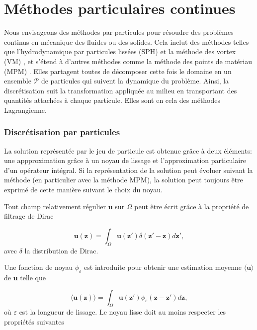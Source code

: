 \section{Méthodes particulaires continues}\label{sec:part_cont}
Nous envisageons des méthodes par particules pour résoudre des problèmes continus en mécanique des fluides ou des solides. Cela inclut des méthodes telles que l'hydrodynamique par particules lissées (SPH) \cite{lucy_1977,gingold_monaghan_sph_1977} et la méthode des vortex (VM) \cite{cottet_vortex_2000}, et s'étend à d'autres méthodes comme la méthode des points de matériau (MPM) \cite{sulsky_particle_1994}. Elles partagent toutes de décomposer cette fois le domaine en un ensemble $\mathcal{P}$ de particules qui suivent la dynamique du problème. Ainsi, la discrétisation suit la transformation appliquée au milieu en transportant des quantités attachées à chaque particule. Elles sont en cela des méthodes Lagrangienne.

\subsubsection{Discrétisation par particules}

La solution représentée par le jeu de particule est obtenue grâce à deux éléments: une appproximation grâce à un noyau de lissage et l'approximation particulaire d'un opérateur intégral. Si la représentation de la solution peut évoluer suivant la méthode (en particulier avec la méthode MPM), la solution peut toujours être exprimé de cette manière suivant le choix du noyau.

Tout champ relativement régulier $\bm{u}$ sur $\Omega$ peut être écrit grâce à la propriété de filtrage de Dirac

\begin{equation*}
    \bm{u}(\bm{z}) = \int_{\Omega} \bm{u}(\bm{z'}) \delta(\bm{z'} - \bm{z})  d\bm{z'},
\end{equation*}avec $\delta$ la distribution de Dirac.

Une fonction de noyau $\phi_\varepsilon$ est introduite pour obtenir une estimation moyenne $\langle \bm{u} \rangle$ de $\bm{u}$ telle que

\begin{equation*}
    \langle \bm{u}(\bm{z}) \rangle = \int_{\Omega} \bm{u}(\bm{z'}) \phi_\varepsilon(\bm{z}-\bm{z'}) d\bm{z},
\end{equation*}où $\varepsilon$ est la longueur de lissage. Le noyau lisse doit au moins respecter les propriétés suivantes

